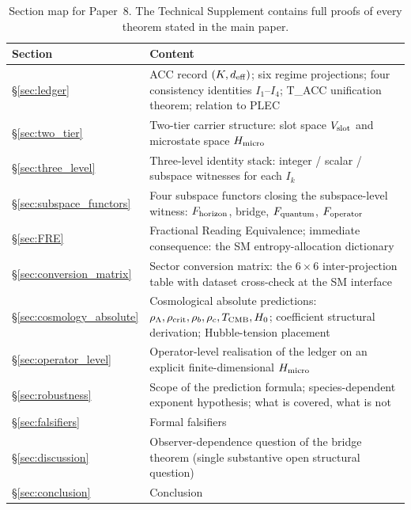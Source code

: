 \documentclass[11pt]{article}
\begin{document}
\begin{table}[h!]
\centering
\small
\begin{tabularx}{\textwidth}{@{}l X@{}}
\toprule
\textbf{Section} & \textbf{Content} \\
\midrule
\S\ref{sec:ledger}                & ACC record $(K, d_{\rm eff})$; six regime projections; four consistency identities $I_1$--$I_4$; T\_ACC unification theorem; relation to PLEC \\
\S\ref{sec:two_tier}              & Two-tier carrier structure: slot space $V_{\rm slot}$ and microstate space $H_{\rm micro}$ \\
\S\ref{sec:three_level}           & Three-level identity stack: integer / scalar / subspace witnesses for each $I_k$ \\
\S\ref{sec:subspace_functors}     & Four subspace functors closing the subspace-level witness: $F_{\rm horizon}$, bridge, $F_{\rm quantum}$, $F_{\rm operator}$ \\
\S\ref{sec:FRE}                   & Fractional Reading Equivalence; immediate consequence: the SM entropy-allocation dictionary \\
\S\ref{sec:conversion_matrix}     & Sector conversion matrix: the $6\times 6$ inter-projection table with dataset cross-check at the SM interface \\
\S\ref{sec:cosmology_absolute}    & Cosmological absolute predictions: $\rho_\Lambda, \rho_{\rm crit}, \rho_b, \rho_c, T_{\rm CMB}, H_0$; coefficient structural derivation; Hubble-tension placement \\
\S\ref{sec:operator_level}        & Operator-level realisation of the ledger on an explicit finite-dimensional $H_{\rm micro}$ \\
\S\ref{sec:robustness}            & Scope of the prediction formula; species-dependent exponent hypothesis; what is covered, what is not \\
\S\ref{sec:falsifiers}            & Formal falsifiers \\
\S\ref{sec:discussion}            & Observer-dependence question of the bridge theorem (single substantive open structural question) \\
\S\ref{sec:conclusion}            & Conclusion \\
\bottomrule
\end{tabularx}
\caption{Section map for Paper~8.  The Technical Supplement contains full proofs of every theorem stated in the main paper.}\label{tab:section_map}
\end{table}
\end{document}
